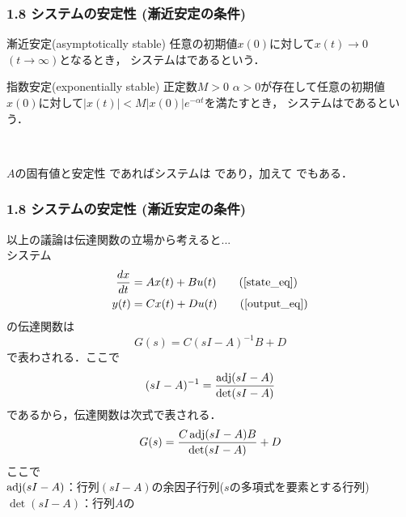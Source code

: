 \begin{frame}[t]
\frametitle{1.8 システムの安定性 (漸近安定の条件)}
\begin{block}{漸近安定(asymptotically stable)}
任意の初期値$x(0)$に対して$x(t) \rightarrow 0$ $(t \rightarrow \infty)$となるとき，
システムはであるという．
\end{block}
\begin{block}{指数安定(exponentially stable)}
正定数$M>0$ $\alpha>0$が存在して任意の初期値$x(0)$に対して$|x(t)| < M |x(0)| e^{-\alpha t}$を満たすとき，
システムはであるという．
\end{block}
\ \\

\begin{block}{$A$の固有値と安定性}
であればシステムは であり，加えて でもある．
\end{block}

\end{frame}


\begin{frame}[t]
\frametitle{1.8 システムの安定性 (漸近安定の条件)}
以上の議論は伝達関数の立場から考えると...\\
システム
\begin{align}
   \frac{dx}{dt} &= A x(t) + B u(t) \tag{\ref{state_eq}} \\
   y(t) &= C x(t) + D u(t) \tag{\ref{output_eq}}
\end{align}
の伝達関数は
\begin{equation}
 G(s) = C ( sI - A )^{-1} B + D
\end{equation}
で表わされる．ここで
\begin{equation}
 (s I - A)^{-1}
  = \frac{\mathop{\rm adj}\nolimits (s I - A)}{\mathop{\rm det}\nolimits (s I - A )}
\end{equation}
であるから，伝達関数は次式で表される．
\begin{equation}
 G(s)
  = \frac{C \mathop{\rm adj}\nolimits (s I - A)B}{\mathop{\rm det}\nolimits (s I - A )}
  + D
\end{equation}
ここで\\
$\mathop{\rm adj}\nolimits (s I - A)$：行列$(s I - A)$の余因子行列($s$の多項式を要素とする行列)\\
$\det (s I - A)$：行列$A$の
\end{frame}


